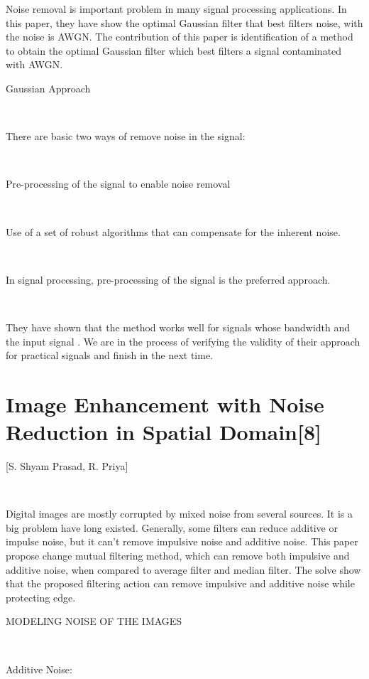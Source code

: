 Noise removal is important problem in many signal processing applications. In this paper, they have show the optimal Gaussian filter that best filters noise, with the noise is AWGN. The contribution of this paper is identification of a method to obtain the optimal Gaussian filter which best filters a signal contaminated with AWGN. 

Gaussian Approach

\

There are basic two ways of remove noise in the signal: 

\

Pre-processing of the signal to enable noise removal  

\

Use of a set of robust algorithms that can compensate for the inherent noise. 

\

In signal processing, pre-processing of the signal is the preferred approach.

\

They have shown that the method works well for signals whose bandwidth and the input signal . We are in the process of verifying the validity of their approach for practical signals and finish in the next time.

\section{Image Enhancement with Noise Reduction in Spatial Domain[8]}
[S. Shyam Prasad, R. Priya] 

\



Digital images are mostly corrupted by mixed noise from several sources. It is a big problem have long existed. Generally, some filters can reduce additive or impulse noise, but it can't remove impulsive noise and additive noise. This paper propose change mutual filtering method, which can remove both impulsive and additive noise, when compared to average filter and median filter.  The solve show that the proposed  filtering action can remove impulsive and additive noise while protecting edge.

MODELING NOISE OF THE IMAGES

\

Additive Noise:

